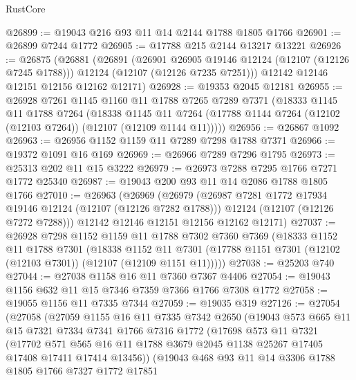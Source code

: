 \begin{lexlean}{RustCore}
\begin{coremodule}
@26899 := @19043 @216 @93 @11 @14 @2144 @1788 @1805 @1766
@26901 := @26899 @7244 @1772
@26905 := @17788 @215 @2144 @13217 @13221
@26926 := @26875
    (@26881
      (@26891
        (@26901 @26905 @19146 @12124 (@12107 (@12126 @7245 @1788)))
        @12124
        (@12107 (@12126 @7235 @7251)))
      @12142
      @12146
      @12151
      @12156
      @12162
      @12171)
@26928 := @19353 @2045 @12181
@26955 := @26928
    @7261
    @1145
    @1160
    @11
    @1788
    @7265
    @7289
    @7371
    (@18333
      @1145
      @11
      @1788
      @7264
      (@18338
        @1145
        @11
        @7264
        (@17788 @1144 @7264 (@12102 (@12103 @7264)) (@12107 (@12109 @1144 @11)))))
@26956 := @26867 @1092
@26963 := @26956 @1152 @1159 @11 @7289 @7298 @1788 @7371
@26966 := @19372 @1091 @16 @169
@26969 := @26966 @7289 @7296 @1795
@26973 := @25313 @202 @11 @15 @3222
@26979 := @26973 @7288 @7295 @1766 @7271 @1772 @25340
@26987 := @19043 @200 @93 @11 @14 @2086 @1788 @1805 @1766
@27010 := @26963
    (@26969
      (@26979
        (@26987 @7281 @1772 @17934 @19146 @12124 (@12107 (@12126 @7282 @1788)))
        @12124
        (@12107 (@12126 @7272 @7288)))
      @12142
      @12146
      @12151
      @12156
      @12162
      @12171)
@27037 := @26928
    @7298
    @1152
    @1159
    @11
    @1788
    @7302
    @7360
    @7369
    (@18333
      @1152
      @11
      @1788
      @7301
      (@18338
        @1152
        @11
        @7301
        (@17788 @1151 @7301 (@12102 (@12103 @7301)) (@12107 (@12109 @1151 @11)))))
@27038 := @25203 @740
@27044 := @27038 @1158 @16 @11 @7360 @7367 @4406
@27054 := @19043 @1156 @632 @11 @15 @7346 @7359 @7366 @1766 @7308 @1772
@27058 := @19055 @1156 @11 @7335 @7344
@27059 := @19035 @319
@27126 := @27054
    (@27058
      (@27059
        @1155
        @16
        @11
        @7335
        @7342
        @2650
        (@19043
          @573
          @665
          @11
          @15
          @7321
          @7334
          @7341
          @1766
          @7316
          @1772
          (@17698
            @573
            @11
            @7321
            (@17702
              @571
              @565
              @16
              @11
              @1788
              @3679
              @2045
              @1138
              @25267
              @17405
              @17408
              @17411
              @17414
              @13456))
          (@19043
            @468
            @93
            @11
            @14
            @3306
            @1788
            @1805
            @1766
            @7327
            @1772
            @17851

\end{coremodule}
\end{lexlean}
